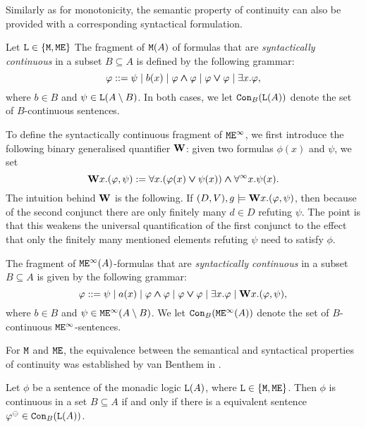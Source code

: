 Similarly as for monotonicity, the semantic property of continuity can also be 
provided with a corresponding syntactical formulation.

\begin{definition}
Let $\llang \in \{ \ofo, \ofoe \}$
The fragment of $\ofo(A)$ of formulas that are 
\emph{syntactically continuous} in a subset $B \subseteq A$ is 
defined by the following grammar:
\[
\phi \defbnf \psi 
   \mid b(x) 
   \mid \phi \land \phi \mid \phi \lor \phi
   \mid \exists x.\phi,
\]
where $b\in B$ and $\psi \in \llang(A\setminus B)$. 
In both cases, we let $\cont{\llang(A)}{B}$ denote the set of $B$-continuous 
sentences.
\end{definition}

To define the syntactically continuous fragment of $\ofoei$, we first introduce
the following binary generalised quantifier $\wqu$: given two formulas $\phi(x)$ 
and $\psi$, we set
\[
\wqu x.(\phi,\psi) \isdef \forall x.(\phi(x) \lor \psi(x)) \land \dqu x.\psi(x).
\]
The intuition behind $\wqu$ is the following. If $(D,V),g \models \wqu x.(\phi,
\psi)$, then because of the second conjunct there are only finitely many $d \in
D$ refuting $\psi$. 
The point is that this weakens the universal quantification of the first conjunct
to the effect that only the finitely many mentioned elements refuting $\psi$ need
to satisfy $\phi$.

\begin{definition}
The fragment of $\ofoei(A)$-formulas that are 
\emph{syntactically continuous} in a subset $B \subseteq A$ is given by the 
following grammar:
\[
\phi \defbnf \psi 
   \mid a(x) 
   \mid \phi \land \phi \mid \phi \lor \phi 
   \mid \exists x.\phi \mid \wqu x.(\phi,\psi),
\]
where $b\in B$ and $\psi \in \ofoei(A\setminus B)$. 
We let $\cont{\ofoei(A)}{B}$ denote the set of $B$-continuous $\ofoei$-sentences.
\end{definition}


For $\ofo$ and $\ofoe$, the equivalence between the semantical and syntactical 
properties of continuity was established by van Benthem 
in \cite{van1997dynamic}. 

\begin{proposition}\label{fact:vb}
Let $\phi$ be a sentence of the monadic logic $\llang(A)$, where $\llang \in 
\{ \ofo, \ofoe\}$.
Then $\phi$ is continuous in a set $B \subseteq A$ if and only if there is a 
equivalent sentence $\phi^{\tcont} \in \cont{\llang(A)}{B}$.
\end{proposition}


